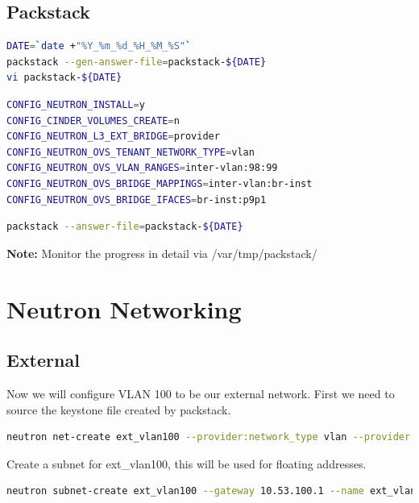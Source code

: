 \documentclass[11pt,letterpaper,oneside]{book}
\begin{document}
\subsection{Packstack}
\begin{lstlisting}[caption={Configure Packstack},language=bash]
DATE=`date +"%Y_%m_%d_%H_%M_%S"`
packstack --gen-answer-file=packstack-${DATE}
vi packstack-${DATE}
\end{lstlisting}
\begin{lstlisting}[caption={Answer file changes},language=bash]
CONFIG_NEUTRON_INSTALL=y
CONFIG_CINDER_VOLUMES_CREATE=n
CONFIG_NEUTRON_L3_EXT_BRIDGE=provider 
CONFIG_NEUTRON_OVS_TENANT_NETWORK_TYPE=vlan 
CONFIG_NEUTRON_OVS_VLAN_RANGES=inter-vlan:98:99
CONFIG_NEUTRON_OVS_BRIDGE_MAPPINGS=inter-vlan:br-inst 
CONFIG_NEUTRON_OVS_BRIDGE_IFACES=br-inst:p9p1 
\end{lstlisting}

\begin{lstlisting}[caption={Execute Packstack},language=bash]
packstack --answer-file=packstack-${DATE}
\end{lstlisting}
\textbf{Note:} Monitor the progress in detail via /var/tmp/packstack/

\section{Neutron Networking}

\subsection{External}
Now we will configure VLAN 100 to be our external network.  First we need to source the keystone file created by packstack. %

\begin{lstlisting}[caption={Create network},language=bash]
neutron net-create ext_vlan100 --provider:network_type vlan --provider:physical_network inter-vlan --provider:segmentation_id 100 --router:external=True
\end{lstlisting}

Create a subnet for ext\_vlan100, this will be used for floating addresses.

\begin{lstlisting}[caption={Create subnet},language=bash]
neutron subnet-create ext_vlan100 --gateway 10.53.100.1 --name ext_vlan100_subnet 10.53.100.0/24 --allocation-pool start=10.53.100.10,end=10.53.100.253 --enable_dhcp=False
\end{lstlisting}
\end{document}
